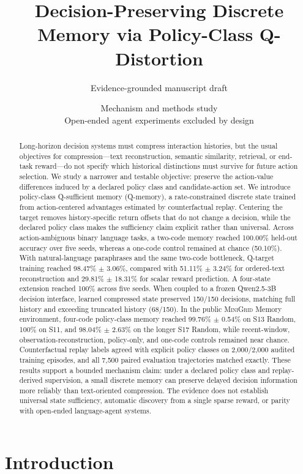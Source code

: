 \documentclass[11pt]{article}
\title{\textcolor{inkblue}{Decision-Preserving Discrete Memory via Policy-Class Q-Distortion}}
\author{Evidence-grounded manuscript draft}
\date{\small Mechanism and methods study\\Open-ended agent experiments excluded by design}
\newcommand{\qmemory}{policy-class Q-sufficient memory (Q-memory)}
\newcommand{\minigrid}{\textsc{MiniGrid}}
\newcommand{\qwen}{Qwen2.5}
\begin{document}
\maketitle

\begin{abstract}
Long-horizon decision systems must compress interaction histories, but the usual objectives for compression---text reconstruction, semantic similarity, retrieval, or end-task reward---do not specify which historical distinctions must survive for future action selection. We study a narrower and testable objective: preserve the action-value differences induced by a declared policy class and candidate-action set. We introduce \qmemory, a rate-constrained discrete state trained from action-centered advantages estimated by counterfactual replay. Centering the target removes history-specific return offsets that do not change a decision, while the declared policy class makes the sufficiency claim explicit rather than universal. Across action-ambiguous binary language tasks, a two-code memory reached 100.00\% held-out accuracy over five seeds, whereas a one-code control remained at chance (50.10\%). With natural-language paraphrases and the same two-code bottleneck, Q-target training reached 98.47\% $\pm$ 3.06\%, compared with 51.11\% $\pm$ 3.24\% for ordered-text reconstruction and 29.81\% $\pm$ 18.31\% for scalar reward prediction. A four-state extension reached 100\% across five seeds. When coupled to a frozen \qwen-3B decision interface, learned compressed state preserved 150/150 decisions, matching full history and exceeding truncated history (68/150). In the public \minigrid{} Memory environment, four-code policy-class memory reached 99.76\% $\pm$ 0.54\% on S13 Random, 100\% on S11, and 98.04\% $\pm$ 2.63\% on the longer S17 Random, while recent-window, observation-reconstruction, policy-only, and one-code controls remained near chance. Counterfactual replay labels agreed with explicit policy classes on 2,000/2,000 audited training episodes, and all 7,500 paired evaluation trajectories matched exactly. These results support a bounded mechanism claim: under a declared policy class and replay-derived supervision, a small discrete memory can preserve delayed decision information more reliably than text-oriented compression. The evidence does not establish universal state sufficiency, automatic discovery from a single sparse reward, or parity with open-ended language-agent systems.
\end{abstract}

\section{Introduction}
\end{document}
